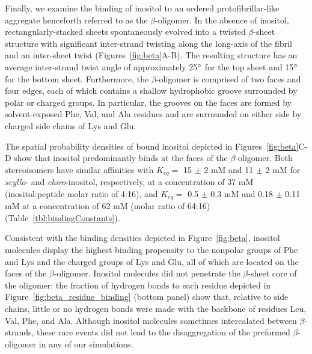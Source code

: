 Finally, we examine the binding of inositol to an ordered protofibrillar-like aggregate henceforth referred to as the $\beta$-oligomer. In the absence of inositol, rectangularly-stacked sheets %
spontaneously evolved into a twisted $\beta$-sheet structure with significant inter-strand twisting along the long-axis of the fibril and an inter-sheet twist (Figures~\ref{fig:beta}A-B). The resulting structure has an average inter-strand twist angle of approximately 25$^\circ$ for the top sheet and 15$^\circ$ for the bottom sheet. Furthermore, the $\beta$-oligomer is comprised of two faces and four edges, %
each of which contains a shallow hydrophobic groove surrounded by polar or charged groups.  In particular, the grooves on the faces are formed by solvent-exposed Phe, Val, and Ala residues and are surrounded on either side by charged side chains of Lys and Glu. %

The spatial probability densities of bound inositol depicted in Figures~\ref{fig:beta}C-D show that inositol predominantly binds at the faces of the $\beta$-oligomer. Both stereoisomers have similar affinities with $K_{eq}=$ 15 $\pm$ 2 mM and 11 $\pm$ 2 mM for \emph{scyllo}- and \emph{chiro}-inositol, respectively, at a concentration of 37 mM (inositol:peptide molar ratio of 4:16), and $K_{eq}=$ 0.5 $\pm$ 0.3 mM and 0.18 $\pm$ 0.11 mM at a concentration of 62 mM (molar ratio of 64:16) (Table~\ref{tbl:bindingConstants}).   

Consistent with the binding densities depicted in Figure~\ref{fig:beta}, inositol molecules display the highest binding propensity to the nonpolar groups of Phe and Lys and the charged groups of Lys and Glu, all of which are located on the faces of the $\beta$-oligomer. 
Inositol molecules did not penetrate the $\beta$-sheet core of the oligomer: the fraction of hydrogen bonds to each residue depicted in Figure~\ref{fig:beta_residue_binding} (bottom panel) show that, relative to side chains, little or no hydrogen bonds were made with the backbone of residues Leu, Val, Phe, and Ala. Although inositol molecules sometimes intercalated between $\beta$-strands, these rare events did not lead to the disaggregation of the preformed $\beta$-oligomer in any of our simulations.

